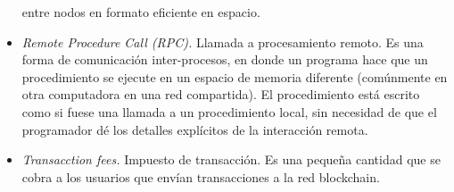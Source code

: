 \begin{itemize}
     entre nodos en formato eficiente en espacio.
     \item \textit{Remote Procedure Call (RPC).} Llamada a procesamiento remoto. Es una forma de comunicación inter-procesos,
     en donde un programa hace que un procedimiento se ejecute en un espacio de memoria diferente (comúnmente en otra computadora
     en una red compartida). El procedimiento  está escrito como si fuese una llamada a un procedimiento local, sin necesidad de
     que el programador dé los detalles explícitos de la interacción remota.
     \item \textit{Transacction fees.} Impuesto de transacción. Es una pequeña cantidad que se cobra a los
     usuarios que envían transacciones a la red blockchain.  
\end{itemize}